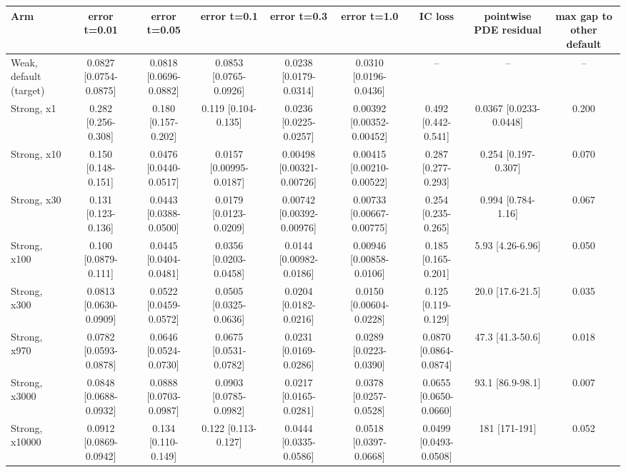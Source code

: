 \begin{tabular}{lcccccccc}
\toprule
Arm & error t=0.01 & error t=0.05 & error t=0.1 & error t=0.3 & error t=1.0 & IC loss & pointwise PDE residual & max gap to other default \\
\midrule
Weak, default (target) & 0.0827 {\scriptsize[0.0754-0.0875]} & 0.0818 {\scriptsize[0.0696-0.0882]} & 0.0853 {\scriptsize[0.0765-0.0926]} & 0.0238 {\scriptsize[0.0179-0.0314]} & 0.0310 {\scriptsize[0.0196-0.0436]} & -- & -- & -- \\
Strong, x1 & 0.282 {\scriptsize[0.256-0.308]} & 0.180 {\scriptsize[0.157-0.202]} & 0.119 {\scriptsize[0.104-0.135]} & 0.0236 {\scriptsize[0.0225-0.0257]} & 0.00392 {\scriptsize[0.00352-0.00452]} & 0.492 {\scriptsize[0.442-0.541]} & 0.0367 {\scriptsize[0.0233-0.0448]} & 0.200 \\
Strong, x10 & 0.150 {\scriptsize[0.148-0.151]} & 0.0476 {\scriptsize[0.0440-0.0517]} & 0.0157 {\scriptsize[0.00995-0.0187]} & 0.00498 {\scriptsize[0.00321-0.00726]} & 0.00415 {\scriptsize[0.00210-0.00522]} & 0.287 {\scriptsize[0.277-0.293]} & 0.254 {\scriptsize[0.197-0.307]} & 0.070 \\
Strong, x30 & 0.131 {\scriptsize[0.123-0.136]} & 0.0443 {\scriptsize[0.0388-0.0500]} & 0.0179 {\scriptsize[0.0123-0.0209]} & 0.00742 {\scriptsize[0.00392-0.00976]} & 0.00733 {\scriptsize[0.00667-0.00775]} & 0.254 {\scriptsize[0.235-0.265]} & 0.994 {\scriptsize[0.784-1.16]} & 0.067 \\
Strong, x100 & 0.100 {\scriptsize[0.0879-0.111]} & 0.0445 {\scriptsize[0.0404-0.0481]} & 0.0356 {\scriptsize[0.0203-0.0458]} & 0.0144 {\scriptsize[0.00982-0.0186]} & 0.00946 {\scriptsize[0.00858-0.0106]} & 0.185 {\scriptsize[0.165-0.201]} & 5.93 {\scriptsize[4.26-6.96]} & 0.050 \\
Strong, x300 & 0.0813 {\scriptsize[0.0630-0.0909]} & 0.0522 {\scriptsize[0.0459-0.0572]} & 0.0505 {\scriptsize[0.0325-0.0636]} & 0.0204 {\scriptsize[0.0182-0.0216]} & 0.0150 {\scriptsize[0.00604-0.0228]} & 0.125 {\scriptsize[0.119-0.129]} & 20.0 {\scriptsize[17.6-21.5]} & 0.035 \\
Strong, x970 & 0.0782 {\scriptsize[0.0593-0.0878]} & 0.0646 {\scriptsize[0.0524-0.0730]} & 0.0675 {\scriptsize[0.0531-0.0782]} & 0.0231 {\scriptsize[0.0169-0.0286]} & 0.0289 {\scriptsize[0.0223-0.0390]} & 0.0870 {\scriptsize[0.0864-0.0874]} & 47.3 {\scriptsize[41.3-50.6]} & 0.018 \\
Strong, x3000 & 0.0848 {\scriptsize[0.0688-0.0932]} & 0.0888 {\scriptsize[0.0703-0.0987]} & 0.0903 {\scriptsize[0.0785-0.0982]} & 0.0217 {\scriptsize[0.0165-0.0281]} & 0.0378 {\scriptsize[0.0257-0.0528]} & 0.0655 {\scriptsize[0.0650-0.0660]} & 93.1 {\scriptsize[86.9-98.1]} & 0.007 \\
Strong, x10000 & 0.0912 {\scriptsize[0.0869-0.0942]} & 0.134 {\scriptsize[0.110-0.149]} & 0.122 {\scriptsize[0.113-0.127]} & 0.0444 {\scriptsize[0.0335-0.0586]} & 0.0518 {\scriptsize[0.0397-0.0668]} & 0.0499 {\scriptsize[0.0493-0.0508]} & 181 {\scriptsize[171-191]} & 0.052 \\
\bottomrule
\end{tabular}

